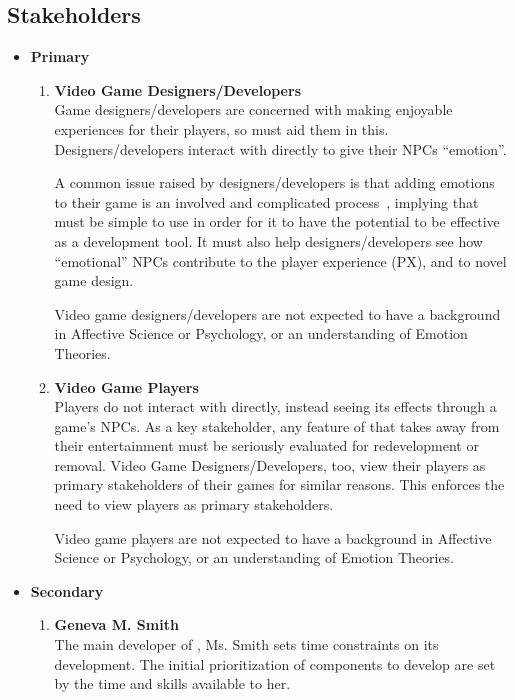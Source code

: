 \subsection{Stakeholders}\label{sec:doc_stakeholder}
\begin{itemize}
    \item \textbf{Primary}
    \begin{enumerate}

        \item \textbf{Video Game Designers/Developers} \\
        Game designers/developers are concerned with making enjoyable
        experiences for their players, so \progname{} must aid them in this.
        Designers/developers interact with \progname{} directly to give their
        NPCs ``emotion''.

        A common issue raised by designers/developers is that adding emotions
        to their game is an involved and complicated
        process~\citep{broekens2016emotional}, implying that \progname{} must
        be simple to use in order for it to have the potential to be effective
        as a development tool. It must also help designers/developers see how
        ``emotional'' NPCs contribute to the player experience (PX), and to
        novel game design.

        Video game designers/developers are not expected to have a background
        in Affective Science or Psychology, or an understanding of Emotion
        Theories.

        \item \textbf{Video Game Players} \\
        Players do not interact with \progname{} directly, instead seeing its
        effects through a game's NPCs. As a key stakeholder, any feature of
        \progname{} that takes away from their entertainment must be seriously
        evaluated for redevelopment or removal. Video Game
        Designers/Developers, too, view their players as primary stakeholders
        of their games for similar reasons. This enforces the need to view
        players as primary stakeholders.

        Video game players are not expected to have a background in Affective
        Science or Psychology, or an understanding of Emotion Theories.

    \end{enumerate}

    \item \textbf{Secondary}
    \begin{enumerate}
        \item \textbf{Geneva M. Smith} \\
        The main developer of \progname{}, Ms. Smith sets time constraints on
        its development. The initial prioritization of \progname{} components
        to develop are set by the time and skills available to her.


\end{enumerate}
\end{itemize}
